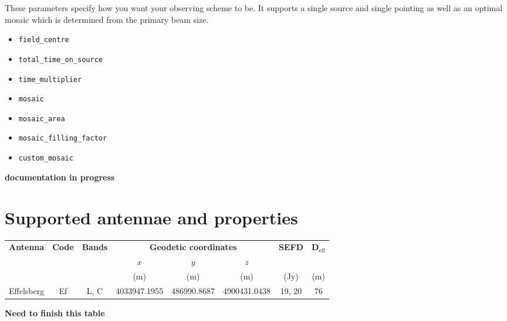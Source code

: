 \documentclass[11pt]{report_jfr}
\begin{document}
These parameters specify how you want your observing scheme to be. It supports a single source and single pointing as well as an optimal mosaic which is determined from the primary beam size.
%
\begin{itemize}
	\item \texttt{field\_centre}   
	\item \texttt{total\_time\_on\_source} 
	\item \texttt{time\_multiplier}  
	\item \texttt{mosaic}                                   
	\item \texttt{mosaic\_area}              
	\item \texttt{mosaic\_filling\_factor}
	\item \texttt{custom\_mosaic} 
\end{itemize}

\textbf{documentation in progress}

\appendix

\section{Supported antennae and properties}\label{a:supported_antennae}

\begin{longtable}{cccccccc}
	\toprule
	\textbf{Antenna} & \textbf{Code} & \textbf{Bands} & \multicolumn{3}{c}{\textbf{Geodetic coordinates}} & \textbf{SEFD} & $\boldsymbol{D}_\mathrm{eff}$\\
	& & & $x$ & $y$ & $z$ & & \\
	& & & (m) & (m) & (m) & (Jy) & (m) \\
	\hline\endhead
	Effelsberg & Ef & L, C & 4033947.1955 & 486990.8687 & 4900431.0438 & 19, 20 & 76 \\
\end{longtable}
\textbf{Need to finish this table}
\end{document}
